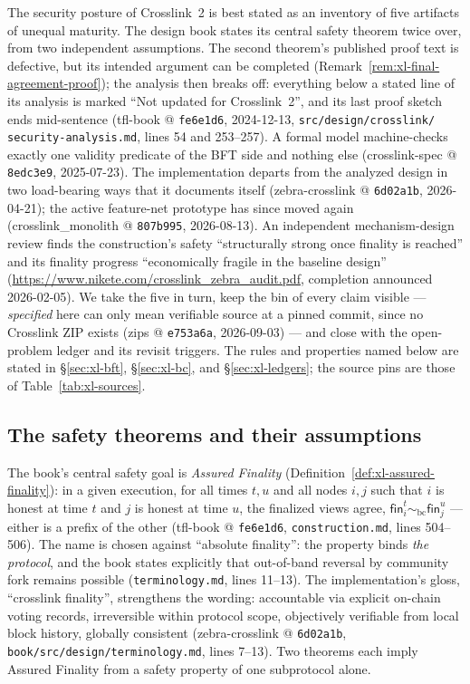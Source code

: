 \documentclass[11pt,a4paper]{article}
\theoremstyle{definition}
\begin{document}
The security posture of Crosslink~2 is best stated as an inventory of five
artifacts of unequal maturity. The design book states its central safety
theorem twice over, from two independent assumptions. The second theorem's
published proof text is defective, but its intended argument can be
completed (Remark~\ref{rem:xl-final-agreement-proof}); the analysis then
breaks off:
everything below a stated line of its analysis is marked ``Not updated for
Crosslink~2'', and its last proof sketch ends mid-sentence (tfl-book @
\texttt{fe6e1d6}, 2024-12-13, \texttt{src/design/crosslink/}%
\texttt{security-analysis.md}, lines 54 and 253--257). A formal model
machine-checks exactly one validity predicate of the BFT side and nothing
else (crosslink-spec @ \texttt{8edc3e9}, 2025-07-23). The implementation
departs from the analyzed design in two load-bearing ways that it documents
itself (zebra-crosslink @ \texttt{6d02a1b}, 2026-04-21); the active
feature-net prototype has since moved again
(crosslink\_monolith @ \texttt{807b995}, 2026-08-13). An independent
mechanism-design review finds the construction's safety ``structurally
strong once finality is reached'' and its finality progress ``economically
fragile in the baseline design''
(\url{https://www.nikete.com/crosslink_zebra_audit.pdf},
completion announced 2026-02-05). We take the five in turn, keep the bin of
every claim visible --- \emph{specified} here can only mean verifiable
source at a pinned commit, since no Crosslink ZIP exists (zips @
\texttt{e753a6a}, 2026-09-03) --- and close with the open-problem ledger
and its revisit triggers. The rules and properties named below are
stated in \S\ref{sec:xl-bft}, \S\ref{sec:xl-bc}, and
\S\ref{sec:xl-ledgers}; the source pins are those of
Table~\ref{tab:xl-sources}.

\subsection{The safety theorems and their assumptions}
\label{sec:xl-safety-theorems}

The book's central safety goal is \emph{Assured Finality}
(Definition~\ref{def:xl-assured-finality}): in a given
execution, for all times $t, u$ and all nodes $i, j$ such that $i$ is
honest at time $t$ and $j$ is honest at time $u$, the finalized views
agree, $\mathsf{fin}_i^t \sim_{\mathrm{bc}} \mathsf{fin}_j^u$ --- either
is a prefix of the other (tfl-book @ \texttt{fe6e1d6},
\texttt{construction.md}, lines 504--506). The name is chosen against
``absolute finality'': the property binds \emph{the protocol}, and the
book states explicitly that out-of-band reversal by community fork remains
possible (\texttt{terminology.md}, lines 11--13). The implementation's
gloss, ``crosslink finality'', strengthens the wording: accountable via
explicit on-chain voting records, irreversible within protocol scope,
objectively verifiable from local block history, globally consistent
(zebra-crosslink @ \texttt{6d02a1b},
\texttt{book/src/design/terminology.md}, lines 7--13). Two theorems each
imply Assured Finality from a safety property of one subprotocol alone.
\end{document}
